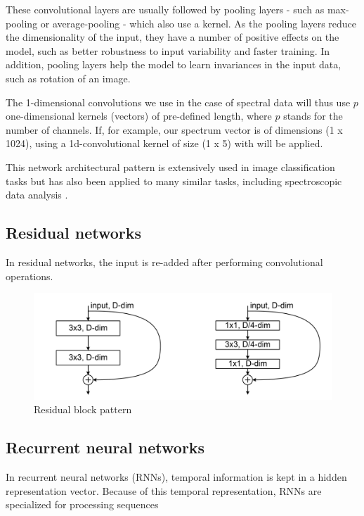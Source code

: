 These convolutional layers are usually followed by pooling layers - such as max-pooling or average-pooling - which also use a kernel. As the pooling layers reduce the dimensionality of the input, they have a number of positive effects on the model, such as better robustness to input variability and faster training. In addition, pooling layers help the model to learn invariances in the input data, such as rotation of an image. 

The 1-dimensional convolutions we use in the case of spectral data will thus use $p$ one-dimensional kernels (vectors) of pre-defined length, where $p$ stands for the number of channels. If, for example, our spectrum vector is of dimensions (1 x 1024), using a 1d-convolutional kernel of size (1 x 5) with will be applied.

This network architectural pattern is extensively used in image classification tasks but has also been applied to many similar tasks, including spectroscopic data analysis \cite{sun_cnnlstm_2023, castorena_deep_2021, drera_deep_2019}.

\subsection{Residual networks}

In residual networks, the input is re-added after performing convolutional operations.
\begin{figure}
    \centering
    \includegraphics{Figures/ResBlockVariants.png}
    \caption{Residual block pattern}
    \label{fig:res_block}
\end{figure}


\subsection{Recurrent neural networks}

In recurrent neural networks (RNNs), temporal information is kept in a hidden representation vector. Because of this temporal representation, RNNs are specialized for processing sequences

